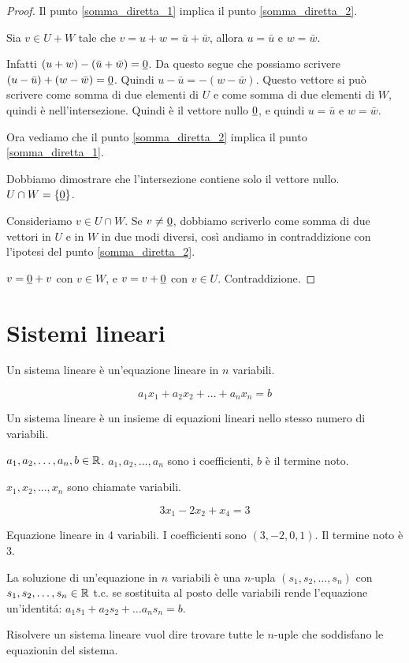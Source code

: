\begin{proof}
Il punto \ref{somma_diretta_1} implica il punto \ref{somma_diretta_2}.

Sia $v \in U + W$ tale che $v = u + w = \bar{u} + \bar{w}$, allora $u = \bar{u}$ e $w = \bar{w}$.

Infatti $(u + w) - (\bar{u} + \bar{w}) = \underline{0}$. Da questo segue che possiamo scrivere $(u - \bar{u}) + (w - \bar{w}) = \underline{0}$. Quindi $u - \bar{u} = - (w - \bar{w})$. Questo vettore si pu\`o scrivere come somma di due elementi di $U$ e come somma di due elementi di $W$, quindi \`e nell'intersezione. Quindi \`e il vettore nullo $\underline{0}$, e quindi $u = \bar{u}$ e $w = \bar{w}$.

Ora vediamo che il punto \ref{somma_diretta_2} implica il punto \ref{somma_diretta_1}.

Dobbiamo dimostrare che l'intersezione contiene solo il vettore nullo. $U \cap W = \{ \underline{0} \}$.

Consideriamo $v \in U \cap W$. Se $v \neq \underline{0}$, dobbiamo scriverlo come somma di due vettori in $U$ e in $W$ in due modi diversi, cos\`i andiamo in contraddizione con l'ipotesi del punto \ref{somma_diretta_2}.

$v = \underline{0} + v$ con $v \in W$, e $v = v + \underline{0}$ con $v \in U$. Contraddizione.
\end{proof}



\section{Sistemi lineari}

Un sistema lineare \`e un'equazione lineare in $n$ variabili.

\[
a_1 x_1 + a_2 x_2 + \dots + a_n x_n = b
\]

Un sistema lineare \`e un insieme di equazioni lineari nello stesso numero di variabili.

$a_1, a_2, \dots, a_n, b \in \mathbb{R}$. $a_1, a_2, \dots, a_n$ sono i coefficienti, $b$ \`e il termine noto.

$x_1, x_2, \dots, x_n$ sono chiamate variabili.

\[
3x_1 - 2x_2 + x_4 = 3
\]

Equazione lineare in 4 variabili. I coefficienti sono $(3, -2, 0, 1)$. Il termine noto \`e 3.

La soluzione di un'equazione in $n$ variabili \`e una $n$-upla $(s_1, s_2, \dots, s_n)$ con $s_1, s_2, \dots, s_n \in \mathbb{R}$ t.c. se sostituita al posto delle variabili rende l'equazione un'identit\'a: $a_1 s_1 + a_2 s_2 + \dots a_n s_n = b$.

Risolvere un sistema lineare vuol dire trovare tutte le $n$-uple che soddisfano le equazionin del sistema.
















